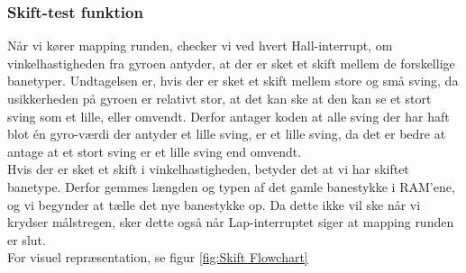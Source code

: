 \subsubsection{Skift-test funktion}
\label{Skift funktion}

Når vi kører mapping runden, checker vi ved hvert Hall-interrupt, om vinkelhastigheden fra gyroen antyder, at der er sket et skift mellem de forskellige banetyper. Undtagelsen er, hvis der er sket et skift mellem store og små sving, da usikkerheden på gyroen er relativt stor, at det kan ske at den kan se et stort sving som et lille, eller omvendt. Derfor antager koden at alle sving der har haft blot én gyro-værdi der antyder et lille sving, er et lille sving, da det er bedre at antage at et stort sving er et lille sving end omvendt. 
\\
Hvis der er sket et skift i vinkelhastigheden, betyder det at vi har skiftet banetype. Derfor gemmes længden og typen af det gamle banestykke i RAM'ene, og vi begynder at tælle det nye banestykke op. Da dette ikke vil ske når vi krydser målstregen, sker dette også når Lap-interruptet siger at mapping runden er slut.
\\
For visuel repræsentation, se figur \ref{fig:Skift Flowchart}

